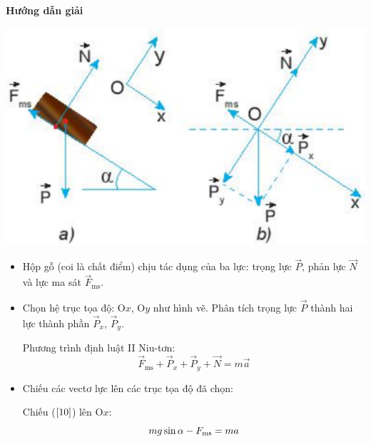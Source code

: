 
\setcounter{section}{0}
\setcounter{viduii}{0}
{	\begin{center}
		\textbf{Hướng dẫn giải}
	\end{center}
	\begin{center}
		\includegraphics[scale=0.5]{../figs/G10-17-3}
	\end{center}
	
	\begin{itemize}
		\item Hộp gỗ (coi là chất điểm) chịu tác dụng của ba lực: trọng lực $\vec P$, phản lực $\vec N$ và lực ma sát $\vec F_\text{ms}$.
		
		\item Chọn hệ trục tọa độ: O$x$, O$y$ như hình vẽ. Phân tích trọng lực $\vec P$ thành hai lực thành phần $\vec P_x$, $\vec P_y$.
		
		Phương trình định luật II Niu-tơn:
		\begin{equation}\label{10}
			\vec F_\text{ms} + \vec P_x + \vec P_y + \vec N = m \vec a
		\end{equation}
		
		\item Chiếu các vectơ lực lên các trục tọa độ đã chọn:
		
		Chiếu ($\ref{10}$) lên O$x$:
		\begin{equation}\label{11}
			mg \sin \alpha - F_\text{ms} = ma \\
		\end{equation}
		

\end{itemize}}
